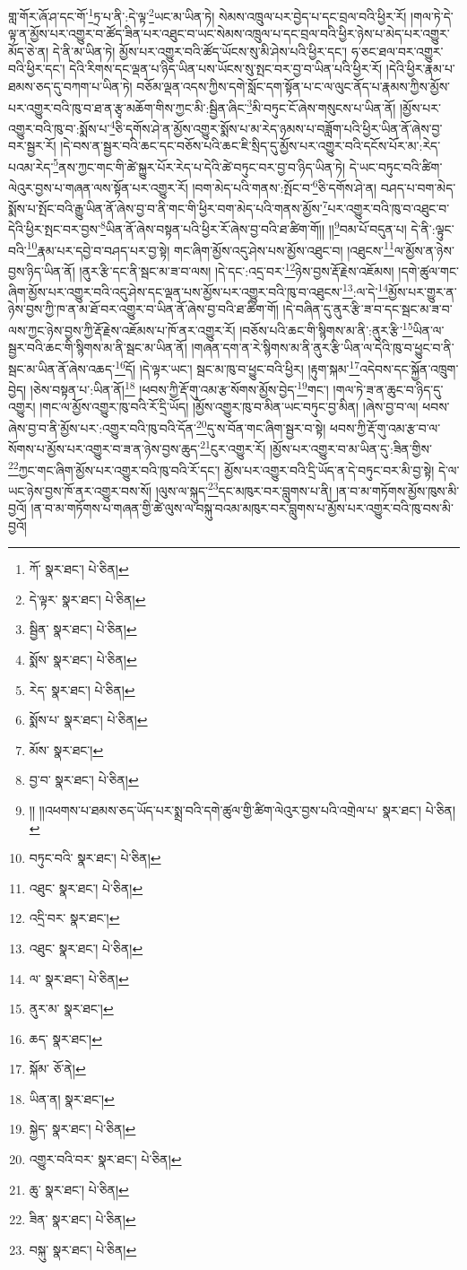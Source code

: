 གླ་གོར་ཞོ་ཤ་དང་གོ་\footnote{ཀོ་  སྣར་ཐང་།  པེ་ཅིན། }ཏྲ་པ་ནི་:དེ་ལྟ་\footnote{དེ་ལྟར་  སྣར་ཐང་།  པེ་ཅིན། }ཡང་མ་ཡིན་ཏེ། སེམས་འཁྲུལ་པར་བྱེད་པ་དང་བྲལ་བའི་ཕྱིར་རོ། །གལ་ཏེ་དེ་ལྟ་ན་མྱོས་པར་འགྱུར་བ་ཚོད་ཟིན་པར་འཐུང་བ་ཡང་སེམས་འཁྲུལ་པ་དང་བྲལ་བའི་ཕྱིར་ཉེས་པ་མེད་པར་འགྱུར་མོད་ཅེ་ན། དེ་ནི་མ་ཡིན་ཏེ། མྱོས་པར་འགྱུར་བའི་ཚོད་ཡོངས་སུ་མི་ཤེས་པའི་ཕྱིར་དང་། ཧ་ཅང་ཐལ་བར་འགྱུར་བའི་ཕྱིར་དང་། དེའི་རིགས་དང་ལྡན་པ་ཉིད་ཡིན་པས་ཡོངས་སུ་སྤང་བར་བྱ་བ་ཡིན་པའི་ཕྱིར་རོ། །དེའི་ཕྱིར་རྣམ་པ་ཐམས་ཅད་དུ་བཀག་པ་ཡིན་ཏེ། བཅོམ་ལྡན་འདས་ཀྱིས་དགེ་སློང་དག་སྟོན་པ་ང་ལ་ལུང་ནོད་པ་རྣམས་ཀྱིས་མྱོས་པར་འགྱུར་བའི་ཁུ་བ་ཐ་ན་རྩྭ་མཆོག་གིས་ཀྱང་མི་:སྦྱིན་ཞིང་\footnote{སྦྱིན་  སྣར་ཐང་།  པེ་ཅིན། }མི་བཏུང་ངོ་ཞེས་གསུངས་པ་ཡིན་ནོ། །མྱོས་པར་འགྱུར་བའི་ཁུ་བ་:སྨོས་པ་\footnote{སྨོས་  སྣར་ཐང་།  པེ་ཅིན། }ཅི་དགོས་ཤེ་ན་མྱོས་འགྱུར་སྨོས་པ་མ་རེད་ཉམས་པ་བཟློག་པའི་ཕྱིར་ཡིན་ནོ་ཞེས་བྱ་བར་སྦྱར་རོ། །དེ་བས་ན་སྦྱར་བའི་ཆང་དང་བཅོས་པའི་ཆང་ཇི་སྲིད་དུ་མྱོས་པར་འགྱུར་བའི་དངོས་པོར་མ་:རེད་པའམ་རེད་\footnote{རེད་  སྣར་ཐང་།  པེ་ཅིན། }ནས་ཀྱང་གང་གི་ཚེ་སྐྱུར་པོར་རེད་པ་དེའི་ཚེ་བཏུང་བར་བྱ་བ་ཉིད་ཡིན་ཏེ། དེ་ཡང་བཏུང་བའི་ཚིག་ལེའུར་བྱས་པ་གཞན་ལས་སྟོན་པར་འགྱུར་རོ། །བག་མེད་པའི་གནས་:སྤོང་བ་\footnote{སྨོས་པ་  སྣར་ཐང་།  པེ་ཅིན། }ཅི་དགོས་ཤེ་ན། བཤད་པ་བག་མེད་སྨོས་པ་སྤོང་བའི་རྒྱུ་ཡིན་ནོ་ཞེས་བྱ་བ་ནི་གང་གི་ཕྱིར་བག་མེད་པའི་གནས་མྱོས་\footnote{མོས་  སྣར་ཐང་། }པར་འགྱུར་བའི་ཁུ་བ་འཐུང་བ་དེའི་ཕྱིར་སྤང་བར་བྱས་\footnote{བྱ་བ་  སྣར་ཐང་།  པེ་ཅིན། }ཡིན་ནོ་ཞེས་བསྟན་པའི་ཕྱིར་རོ་ཞེས་བྱ་བའི་ཐ་ཚིག་གོ།། །།\footnote{།། །།འཕགས་པ་ཐམས་ཅད་ཡོད་པར་སྨྲ་བའི་དགེ་ཚུལ་གྱི་ཚིག་ལེའུར་བྱས་པའི་འགྲེལ་པ་  སྣར་ཐང་།  པེ་ཅིན། }བམ་པོ་བདུན་པ། དེ་ནི་:ལྟུང་བའི་\footnote{བཏུང་བའི་  སྣར་ཐང་།  པེ་ཅིན། }རྣམ་པར་དབྱེ་བ་བཤད་པར་བྱ་སྟེ། གང་ཞིག་མྱོས་འདུ་ཤེས་པས་མྱོས་འཐུང་བ། །འཐུངས་\footnote{འཐུང་  སྣར་ཐང་།  པེ་ཅིན། }ལ་མྱོས་ན་ཉེས་བྱས་ཉིད་ཡིན་ནོ། །ནུར་རྩི་དང་ནི་སྦང་མ་ཟ་བ་ལས། །དེ་དང་:འདྲ་བར་\footnote{འདྲི་བར་  སྣར་ཐང་། }ཉེས་བྱས་རྡོ་རྗེས་འཇོམས། །དགེ་ཚུལ་གང་ཞིག་མྱོས་པར་འགྱུར་བའི་འདུ་ཤེས་དང་ལྡན་པས་མྱོས་པར་འགྱུར་བའི་ཁུ་བ་འཐུངས་\footnote{འཐུང་  སྣར་ཐང་།  པེ་ཅིན། }:ལ་དེ་\footnote{ལ་  སྣར་ཐང་།  པེ་ཅིན། }མྱོས་པར་གྱུར་ན་ཉེས་བྱས་ཀྱི་ཁ་ན་མ་ཐོ་བར་འགྱུར་བ་ཡིན་ནོ་ཞེས་བྱ་བའི་ཐ་ཚིག་གོ། །དེ་བཞིན་དུ་ནུར་རྩི་ཟ་བ་དང་སྦང་མ་ཟ་བ་ལས་ཀྱང་ཉེས་བྱས་ཀྱི་རྡོ་རྗེས་འཇོམས་པ་ཁོ་ནར་འགྱུར་རོ། །བཅོས་པའི་ཆང་གི་སྙིགས་མ་ནི་:ནུར་རྩི་\footnote{ནུར་མ་  སྣར་ཐང་། }ཡིན་ལ་སྦྱར་བའི་ཆང་གི་སྙིགས་མ་ནི་སྦང་མ་ཡིན་ནོ། །གཞན་དག་ན་རེ་སྙིགས་མ་ནི་ནུར་རྩི་ཡིན་ལ་དེའི་ཁུ་བ་ཕྱུང་བ་ནི་སྦང་མ་ཡིན་ནོ་ཞེས་འཆད་\footnote{ཆད་  སྣར་ཐང་། }དོ། །དེ་ལྟར་ཡང་། སྦང་མ་ཁུ་བ་ཕྱུང་བའི་ཕྱིར། །རྟུག་སྐམ་\footnote{སྐོམ་  ཅོ་ནེ། }འདེབས་དང་སྐྱོན་འཁྲུག་བྱེད། །ཅེས་བསྟན་པ་:ཡིན་ནོ།\footnote{ཡིན་ན།  སྣར་ཐང་། } །ཕབས་ཀྱི་རྡོ་གུ་འམ་རྩ་སོགས་མྱོས་བྱེད་\footnote{སྐྱེད་  སྣར་ཐང་།  པེ་ཅིན། }གང་། །གལ་ཏེ་ཟ་ན་ཆུང་བ་ཉིད་དུ་འགྱུར། །གང་ལ་མྱོས་འགྱུར་ཁུ་བའི་རོ་དྲི་ཡོད། །མྱོས་འགྱུར་ཁུ་བ་མིན་ཡང་བཏུང་བྱ་མིན། །ཞེས་བྱ་བ་ལ། ཕབས་ཞེས་བྱ་བ་ནི་མྱོས་པར་:འགྱུར་བའི་ཁུ་བའི་དོན་\footnote{འགྱུར་བའི་བར་  སྣར་ཐང་།  པེ་ཅིན། }དུ་ས་བོན་གང་ཞིག་སྦྱར་བ་སྟེ། ཕབས་ཀྱི་རྡོ་གུ་འམ་རྩ་བ་ལ་སོགས་པ་མྱོས་པར་འགྱུར་བ་ཟ་ན་ཉེས་བྱས་ཆུད་\footnote{ཆུ་  སྣར་ཐང་།  པེ་ཅིན། }ངུར་འགྱུར་རོ། །མྱོས་པར་འགྱུར་བ་མ་ཡིན་དུ་:ཟིན་གྱིས་\footnote{ཟིན་  སྣར་ཐང་།  པེ་ཅིན། }ཀྱང་གང་ཞིག་མྱོས་པར་འགྱུར་བའི་ཁུ་བའི་རོ་དང་། མྱོས་པར་འགྱུར་བའི་དྲི་ཡོད་ན་དེ་བཏུང་བར་མི་བྱ་སྟེ། དེ་ལ་ཡང་ཉེས་བྱས་ཁོ་ནར་འགྱུར་བས་སོ། །ལུས་ལ་སྐུད་\footnote{བསྐུ་  སྣར་ཐང་།  པེ་ཅིན། }དང་མཁུར་བར་བླུགས་པ་ནི། །ན་བ་མ་གཏོགས་མྱོས་ཁུས་མི་བྱའོ། །ན་བ་མ་གཏོགས་པ་གཞན་གྱི་ཚེ་ལུས་ལ་བསྐུ་བའམ་མཁུར་བར་བླུགས་པ་མྱོས་པར་འགྱུར་བའི་ཁུ་བས་མི་བྱའོ། 
